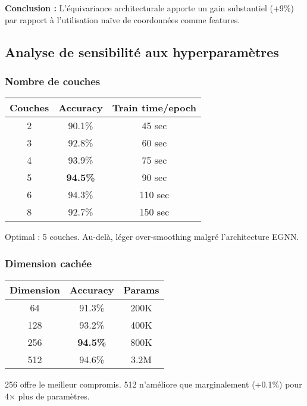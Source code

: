 \textbf{Conclusion :}
L'équivariance architecturale apporte un gain substantiel (+9\%) par rapport à l'utilisation naïve de coordonnées comme features.

\subsection{Analyse de sensibilité aux hyperparamètres}

\subsubsection{Nombre de couches}

\begin{center}
\begin{tabular}{|c|c|c|}
\hline
\textbf{Couches} & \textbf{Accuracy} & \textbf{Train time/epoch} \\
\hline
2 & 90.1\% & 45 sec \\
3 & 92.8\% & 60 sec \\
4 & 93.9\% & 75 sec \\
5 & \textbf{94.5\%} & 90 sec \\
6 & 94.3\% & 110 sec \\
8 & 92.7\% & 150 sec \\
\hline
\end{tabular}
\end{center}

Optimal : 5 couches. Au-delà, léger over-smoothing malgré l'architecture EGNN.

\subsubsection{Dimension cachée}

\begin{center}
\begin{tabular}{|c|c|c|}
\hline
\textbf{Dimension} & \textbf{Accuracy} & \textbf{Params} \\
\hline
64 & 91.3\% & 200K \\
128 & 93.2\% & 400K \\
256 & \textbf{94.5\%} & 800K \\
512 & 94.6\% & 3.2M \\
\hline
\end{tabular}
\end{center}

256 offre le meilleur compromis. 512 n'améliore que marginalement (+0.1\%) pour 4× plus de paramètres.

